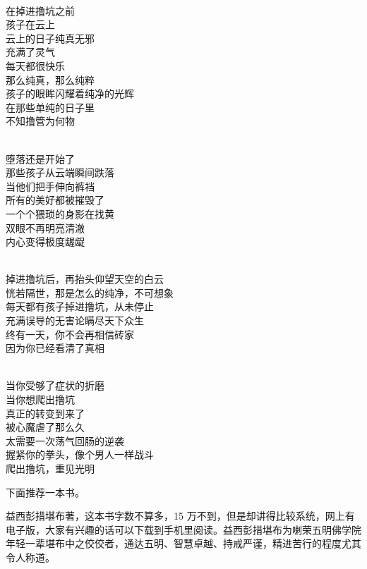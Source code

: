 \begin{poem}[云上的日子]
    \begin{multicols}{2}
        \begin{center}~\\
            在掉进撸坑之前 \\ 孩子在云上 \\ 云上的日子纯真无邪 \\ 充满了灵气 \\ 每天都很快乐 \\ 那么纯真，那么纯粹 \\ 孩子的眼眸闪耀着纯净的光辉 \\ 在那些单纯的日子里 \\ 不知撸管为何物

            ~\\

            堕落还是开始了 \\ 那些孩子从云端瞬间跌落 \\ 当他们把手伸向裤裆 \\ 所有的美好都被摧毁了 \\ 一个个猥琐的身影在找黄 \\ 双眼不再明亮清澈 \\ 内心变得极度龌龊

            ~\\

            掉进撸坑后，再抬头仰望天空的白云 \\ 恍若隔世，那是怎么的纯净，不可想象 \\ 每天都有孩子掉进撸坑，从未停止 \\ 充满误导的无害论瞒尽天下众生 \\ 终有一天，你不会再相信砖家 \\ 因为你已经看清了真相

            ~\\

            当你受够了症状的折磨 \\ 当你想爬出撸坑 \\ 真正的转变到来了 \\ 被心魔虐了那么久 \\ 太需要一次荡气回肠的逆袭 \\ 握紧你的拳头，像个男人一样战斗 \\ 爬出撸坑，重见光明
        \end{center}
    \end{multicols}
\end{poem}

下面推荐一本书。

\begin{book}[《因果明镜论》]
    益西彭措堪布著，这本书字数不算多，15 万不到，但是却讲得比较系统，网上有电子版，大家有兴趣的话可以下载到手机里阅读。益西彭措堪布为喇荣五明佛学院年轻一辈堪布中之佼佼者，通达五明、智慧卓越、持戒严谨，精进苦行的程度尤其令人称道。
\end{book}
